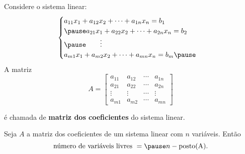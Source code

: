 \documentclass{beamer}
\begin{document}
    \begin{frame}
        Considere o sistema linear:
        \begin{equation*}
	        \begin{cases}
                a_{11}x_1 + a_{12}x_2 + \cdots + a_{1n}x_n = b_1\\\pause
                a_{21}x_1 + a_{22}x_2 + \cdots + a_{2n}x_n = b_2\\\pause
                \qquad \vdots\\
                a_{m1}x_1 + a_{m2}x_2 + \cdots + a_{mn}x_n = b_m\pause
            \end{cases}
        \end{equation*}
        A matriz
        \[
            A = \begin{bmatrix}
                a_{11} & a_{12} & \cdots & a_{1n}\\
                a_{21} & a_{22} & \cdots & a_{2n}\\
                \vdots & \vdots & \cdots & \vdots\\
                a_{m1} & a_{m2} & \cdots & a_{mn}
            \end{bmatrix}
        \]

        é chamada de \textbf{matriz dos coeficientes} do sistema linear.
    \end{frame}

    \begin{frame}

        \begin{teorema}
            Seja $A$ a matriz dos coeficientes de um sistema linear \pause com $n$ variáveis. Então\pause
            \[
                \mbox{número de variáveis livres } = \pause n - \p{A}.
            \]
        \end{teorema}
    \end{frame}
\end{document}
